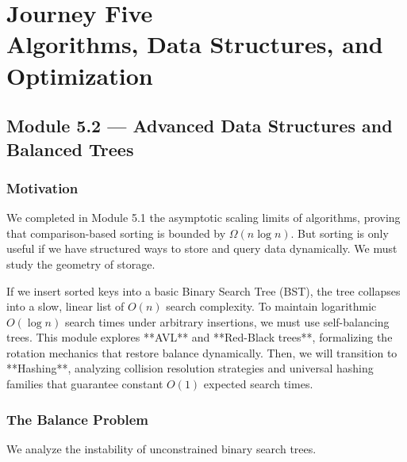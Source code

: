 \documentclass[12pt, a4paper]{book}
\begin{document}
\setcounter{chapter}{4}
\chapter[Journey 5 --- Algorithms, Data Structures, and Optimization]
        {Journey Five\\[8pt]
         \textcolor{ModuleColor}{\large Algorithms, Data Structures, and Optimization}}
\setcounter{section}{1}

\section{Module 5.2 --- Advanced Data Structures and Balanced Trees}
\label{sec:mod5.2}

\subsection*{Motivation}

We completed in Module 5.1 the asymptotic scaling limits of algorithms, proving that comparison-based sorting is bounded by $\Omega(n \log n)$.
But sorting is only useful if we have structured ways to store and query data dynamically.
We must study the geometry of storage.

If we insert sorted keys into a basic Binary Search Tree (BST), the tree collapses into a slow, linear list of $O(n)$ search complexity.
To maintain logarithmic $O(\log n)$ search times under arbitrary insertions, we must use self-balancing trees.
This module explores **AVL** and **Red-Black trees**, formalizing the rotation mechanics that restore balance dynamically.
Then, we will transition to **Hashing**, analyzing collision resolution strategies and universal hashing families that guarantee constant $O(1)$ expected search times.

\subsection{The Balance Problem}

We analyze the instability of unconstrained binary search trees.
\end{document}
